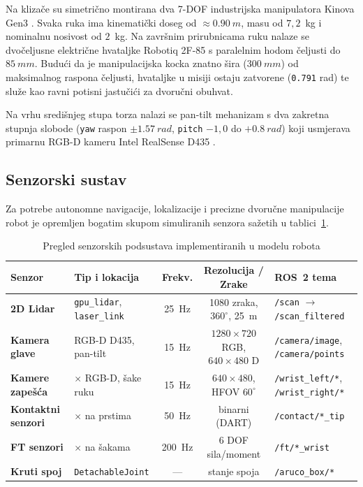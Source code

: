 Na klizače su simetrično montirana dva 7-DOF industrijska manipulatora Kinova Gen3 \cite{kortex}.
Svaka ruka ima kinematički doseg od $\approx \SI{0.90}{m}$, masu od $7{,}2$~kg i nominalnu
nosivost od $2$~kg. Na završnim prirubnicama ruku nalaze se dvočeljusne električne hvataljke
Robotiq 2F-85 s paralelnim hodom čeljusti do $\SI{85}{mm}$. Budući da je manipulacijska kocka znatno
šira ($\SI{300}{mm}$) od maksimalnog raspona čeljusti, hvataljke u misiji ostaju zatvorene
(\texttt{0.791} rad) te služe kao ravni potisni jastučići za dvoručni obuhvat.

Na vrhu središnjeg stupa torza nalazi se pan-tilt mehanizam \cite{pantilt} s dva zakretna stupnja
slobode (\texttt{yaw} raspon $\pm \SI{1.57}{rad}$, \texttt{pitch} $-1{,}0$ do $+\SI{0.8}{rad}$) koji
usmjerava primarnu RGB-D kameru Intel RealSense D435 \cite{realsense}.

\subsection{Senzorski sustav}
\label{sec:03-senzori}

Za potrebe autonomne navigacije, lokalizacije i precizne dvoručne manipulacije robot je opremljen
bogatim skupom simuliranih senzora sažetih u tablici~\ref{tab:senzori}.

\begin{table}[H]
  \centering
  \scriptsize
  \caption{Pregled senzorskih podsustava implementiranih u modelu robota}
  \label{tab:senzori}
  \begin{tabularx}{\textwidth}{@{}>{\bfseries}p{2.6cm}>{\raggedright\arraybackslash}p{2.8cm}cc>{\raggedright\arraybackslash}X@{}}
    \toprule
    Senzor & Tip i lokacija & Frekv. & Rezolucija / Zrake & ROS~2 tema \\
    \midrule
    2D Lidar & \texttt{gpu\_lidar}, \texttt{laser\_link} & 25~Hz & 1080 zraka, $360^\circ$, 25~m & \texttt{/scan} $\rightarrow$ \texttt{/scan\_filtered} \\
    Kamera glave & RGB-D D435, pan-tilt & 15~Hz & $1280\times720$ RGB, $640\times480$ D & \texttt{/camera/image}, \texttt{/camera/points} \\
    Kamere zapešća & 2$\times$ RGB-D, šake ruku & 15~Hz & $640\times480$, HFOV $60^\circ$ & \texttt{/wrist\_left/*}, \texttt{/wrist\_right/*} \\
    Kontaktni senzori & 4$\times$ na prstima & 50~Hz & binarni (DART) & \texttt{/contact/*\_tip} \\
    FT senzori & 2$\times$ na šakama & 200~Hz & 6 DOF sila/moment & \texttt{/ft/*\_wrist} \\
    Kruti spoj & \texttt{DetachableJoint} & --- & stanje spoja & \texttt{/aruco\_box/*} \\
    \bottomrule
  \end{tabularx}
\end{table}

